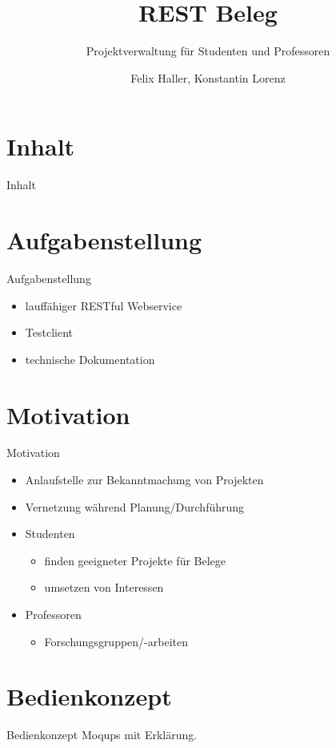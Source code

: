 \documentclass{beamer}
\author{Felix Haller, Konstantin Lorenz}
\title{REST Beleg}
\subtitle{Projektverwaltung für Studenten und Professoren}
\institute{IF13wI-B}
\date{}
\begin{document}
	\maketitle

	\nextframenocontents

	\section*{Inhalt}
	\begin{frame}{Inhalt}
		\tableofcontents
	\end{frame}
	\section{Aufgabenstellung}
		\begin{frame}{Aufgabenstellung}
			\begin{itemize}
				\item lauffähiger RESTful Webservice
				\item Testclient
				\item technische Dokumentation
			\end{itemize}
		\end{frame}
		
	\section{Motivation}
		\begin{frame}{Motivation}
			\begin{itemize}
				\item Anlaufstelle zur Bekanntmachung von Projekten
				\item Vernetzung während Planung/Durchführung
				\item Studenten
				\begin{itemize}
					\item finden geeigneter Projekte für Belege
					\item umsetzen von Interessen	
				\end{itemize}
				\item Professoren
				\begin{itemize}
					\item Forschungsgruppen/-arbeiten
				\end{itemize}
			\end{itemize}
		\end{frame}
		
	\section{Bedienkonzept}
		\begin{frame}{Bedienkonzept}
			Moqups mit Erklärung.
			
		\end{frame}
\end{document}
